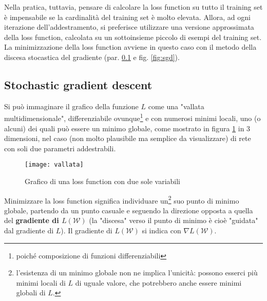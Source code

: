 Nella pratica, tuttavia, pensare di calcolare la loss function su tutto il training set è impensabile se la cardinalità del training set è molto elevata. Allora, ad ogni iterazione dell'addestramento, si preferisce utilizzare una versione approssimata della loss function, calcolata su un sottoinsieme piccolo di esempi del training set. La minimizzazione della loss function avviene in questo caso con il metodo della discesa stocastica del gradiente (par. \ref{SGD} e fig. \ref{fig:sgd}).

\subsection{Stochastic gradient descent}
\label{SGD}
Si può immaginare il grafico della funzione $L$ come una "vallata multidimensionale", differenziabile ovunque\footnote{poiché composizione di funzioni differenziabili} e con numerosi minimi locali, uno (o alcuni) dei quali può essere un minimo globale, come mostrato in figura \ref{vallata} in 3 dimensioni, nel caso (non molto plausibile ma semplice da visualizzare) di rete con soli due parametri addestrabili.

\begin{figure}[h!]
\centering
\texttt{[image: vallata]}
\caption{Grafico di una loss function con due sole variabili}
\label{vallata}
\end{figure}

Minimizzare la loss function significa individuare un\footnote{l'esistenza di un minimo globale non ne implica l'unicità: possono esserci più minimi locali di $L$ di uguale valore, che potrebbero anche essere minimi globali di $L$.} suo punto di minimo globale, partendo da un punto casuale e seguendo la direzione opposta a quella del \textbf{gradiente di $L(\mathcal{W})$} (la "discesa" verso il punto di minimo è cioè "guidata" dal gradiente di $L$). Il gradiente di $L(\mathcal{W})$ si indica con $\nabla L(\mathcal{W})$.

